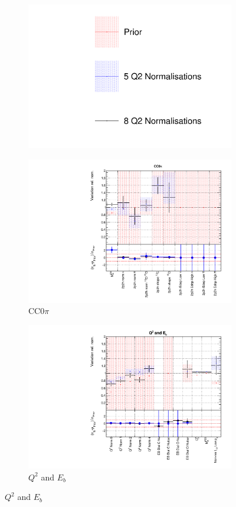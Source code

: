\begin{figure}
\centering
\begin{subfigure}{0.95\textwidth}
  \centering
  \includegraphics[width=0.25\linewidth]{figs/comp5q2vs8q2_leg}
\end{subfigure}
\begin{subfigure}{0.49\textwidth}
  \centering
  \includegraphics[width=0.9\linewidth]{figs/comp5q2vs8q2xsec1}
  \caption{CC0$\pi$}
\end{subfigure}
\begin{subfigure}{0.49\textwidth}
  \centering
  \includegraphics[width=0.9\linewidth]{figs/comp5q2vs8q2xsec2}
  \caption{$Q^2$ and $E_b$}
\end{subfigure}

\end{figure}

